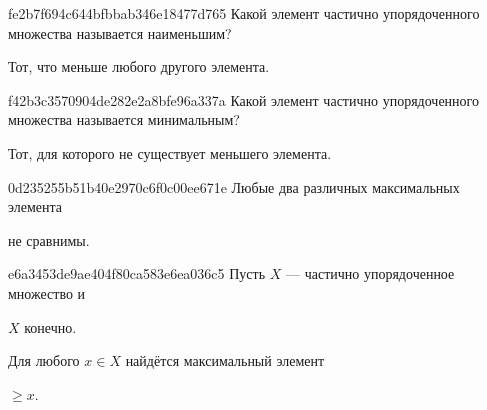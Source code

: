 \begin{note}{fe2b7f694c644bfbbab346e18477d765}
    Какой элемент частично упорядоченного множества называется наименьшим?

    \begin{cloze}{1}
        Тот, что меньше любого другого элемента.
    \end{cloze}
\end{note}

\begin{note}{f42b3c3570904de282e2a8bfe96a337a}
    Какой элемент частично упорядоченного множества называется минимальным?

    \begin{cloze}{1}
        Тот, для которого не существует меньшего элемента.
    \end{cloze}
\end{note}

\begin{note}{0d235255b51b40e2970c6f0c00ee671e}
    Любые два различных максимальных элемента \begin{icloze}{1}не сравнимы.\end{icloze}
\end{note}

\begin{note}{e6a3453de9ae404f80ca583e6ea036c5}
    Пусть \({ X }\) --- частично упорядоченное множество и \begin{icloze}{2}\({ X }\) конечно.\end{icloze}
    Для любого \({ x \in X }\) найдётся максимальный элемент \begin{icloze}{1}\({ \geqslant x }\).\end{icloze}
\end{note}


